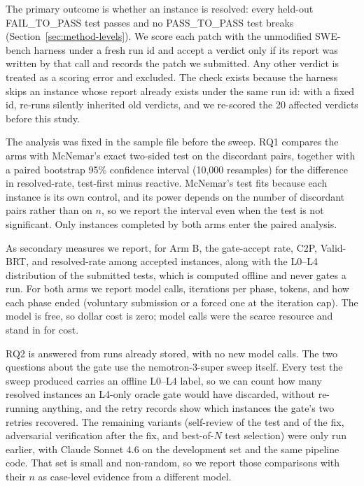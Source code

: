 The primary outcome is whether an instance is resolved: every held-out
FAIL\_TO\_PASS test passes and no PASS\_TO\_PASS test breaks
(Section~\ref{sec:method-levels}). We score each patch with the unmodified
SWE-bench harness under a fresh run id and accept a verdict only if its report
was written by that call and records the patch we submitted. Any other verdict
is treated as a scoring error and excluded. The check exists because the
harness skips an instance whose report already exists under the same run id:
with a fixed id, re-runs silently inherited old verdicts, and we re-scored the
20 affected verdicts before this study.

The analysis was fixed in the sample file before the sweep. RQ1 compares the
arms with McNemar's exact two-sided test on the discordant pairs, together
with a paired bootstrap 95\% confidence interval (10,000 resamples) for the
difference in resolved-rate, test-first minus reactive. McNemar's test fits
because each instance is its own control, and its power depends on the number
of discordant pairs rather than on $n$, so we report the interval even when the
test is not significant. Only instances completed by both arms enter the
paired analysis.

As secondary measures we report, for Arm B, the gate-accept rate, C2P,
Valid-BRT, and resolved-rate among accepted instances, along with the L0--L4
distribution of the submitted tests, which is computed offline and never gates
a run. For both arms we report model calls, iterations per phase, tokens, and
how each phase ended (voluntary submission or a forced one at the iteration
cap). The model is free, so dollar cost is zero; model calls were the scarce
resource and stand in for cost.

RQ2 is answered from runs already stored, with no new model calls. The two
questions about the gate use the nemotron-3-super sweep itself. Every test the
sweep produced carries an offline L0--L4 label, so we can count how many
resolved instances an L4-only oracle gate would have discarded, without
re-running anything, and the retry records show which instances the gate's two
retries recovered. The remaining variants (self-review of the test and of the
fix, adversarial verification after the fix, and best-of-$N$ test selection)
were only run earlier, with Claude Sonnet 4.6 on the development set and the
same pipeline code. That set is small and non-random, so we report those
comparisons with their $n$  as case-level evidence from a
different model.

